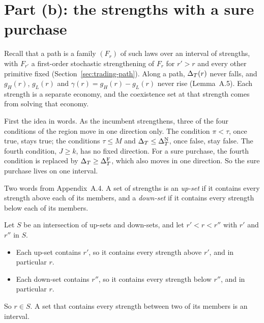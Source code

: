 \section{Part (b): the strengths with a sure purchase}\label{sec:coexistence-proof-b}

Recall that a path is a family \((F_r)\) of such laws over an interval of strengths, with \(F_{r'}\) a first-order
stochastic strengthening of \(F_r\) for \(r'>r\) and every other primitive fixed (Section~\ref{sec:trading-path}).
Along a path, \(\Delta_T(r)\) never falls, and \(g_H(r)\), \(g_L(r)\) and \(\gamma(r)=g_H(r)-g_L(r)\) never rise
(Lemma~A.5). Each strength is a separate economy, and the coexistence set at that strength comes from solving that
economy.

First the idea in words. As the incumbent strengthens, three of the four conditions of the region move in one
direction only. The condition \(\pi<\tau\), once true, stays true; the conditions \(\tau\le M\) and
\(\Delta_T\le\Delta_T^{\rm N}\), once false, stay false. The fourth condition, \(J\ge k\), has no fixed direction. For a sure
purchase, the fourth condition is replaced by \(\Delta_T\ge\Delta_T^{\rm F}\), which also moves in one direction. So the sure
purchase lives on one interval.

Two words from Appendix~A.4. A set of strengths is an \emph{up-set} if it contains every strength above each of its
members, and a \emph{down-set} if it contains every strength below each of its members.

\begin{derivation}
Let \(S\) be an intersection of up-sets and down-sets, and let \(r'<r<r''\) with \(r'\) and \(r''\) in \(S\).
\begin{itemize}
\item Each up-set contains \(r'\), so it contains every strength above \(r'\), and in particular \(r\).
\item Each down-set contains \(r''\), so it contains every strength below \(r''\), and in particular \(r\).
\end{itemize}
So \(r\in S\). A set that contains every strength between two of its members is an interval.
\end{derivation}

